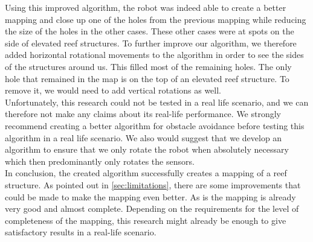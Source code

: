 \documentclass[twoside, 12pt]{article}
\begin{document}
Using this improved algorithm, the robot was indeed able to create a better mapping and close up one of the holes from the previous mapping while reducing the size of the holes in the other cases. These other cases were at spots on the side of elevated reef structures. To further improve our algorithm, we therefore added horizontal rotational movements to the algorithm in order to see the sides of the structures around us. This filled most of the remaining holes. The only hole that remained in the map is on the top of an elevated reef structure. To remove it, we would need to add vertical rotations as well.\\

Unfortunately, this research could not be tested in a real life scenario, and we can therefore not make any claims about its real-life performance. We strongly recommend creating a better algorithm for obstacle avoidance before testing this algorithm in a real life scenario. We also would suggest that we develop an algorithm to ensure that we only rotate the robot when absolutely necessary which then predominantly only rotates the sensors.\\

In conclusion, the created algorithm successfully creates a mapping of a reef structure. As pointed out in \autoref{sec:limitations}, there are some improvements that could be made to make the mapping even better. As is the mapping is already very good and almost complete. Depending on the requirements for the level of completeness of the mapping, this research might already be enough to give satisfactory results in a real-life scenario.\\

\newpage

{}

\end{document}
